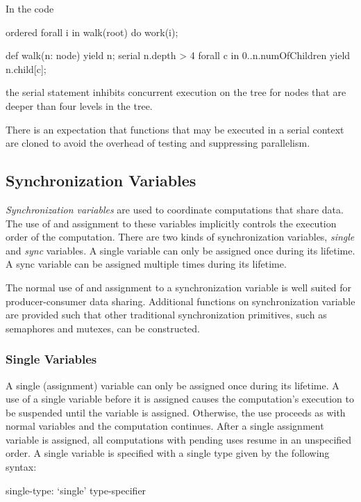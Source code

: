 \begin{example}
In the code
\begin{chapel}
ordered forall i in walk(root) do
  work(i);

def walk(n: node) {
  yield n;
  serial n.depth > 4 forall c in 0..n.numOfChildren {
      yield n.child[c];
  }
}
\end{chapel}
the serial statement inhibits concurrent execution on the tree for
nodes that are deeper than four levels in the tree.
\end{example}

There is an expectation that functions that may be executed in a
serial context are cloned to avoid the overhead of testing and
suppressing parallelism.

\subsection{Synchronization Variables}
\label{Synchronization_Variables}

{\em Synchronization variables} are used to coordinate computations
that share data.  The use of and assignment to these variables
implicitly controls the execution order of the computation.  There are
two kinds of synchronization variables, {\em single} and {\em sync}
variables.  A single variable can only be assigned once during its
lifetime.  A sync variable can be assigned multiple times during its
lifetime.

The normal use of and assignment to a synchronization variable is well
suited for producer-consumer data sharing.  Additional functions on
synchronization variable are provided such that other traditional
synchronization primitives, such as semaphores and mutexes, can be
constructed.

\subsubsection{Single Variables}
\label{Single_Variables}

A single (assignment) variable can only be assigned once during its
lifetime.  A use of a single variable before it is assigned causes the
computation's execution to be suspended until the variable is
assigned. Otherwise, the use proceeds as with normal variables and the
computation continues.  After a single assignment variable is assigned,
all computations with pending uses resume in an unspecified order.  A
single variable is specified with a single type given by the following
syntax:
\begin{syntax}
single-type:
  `single' type-specifier
\end{syntax}


